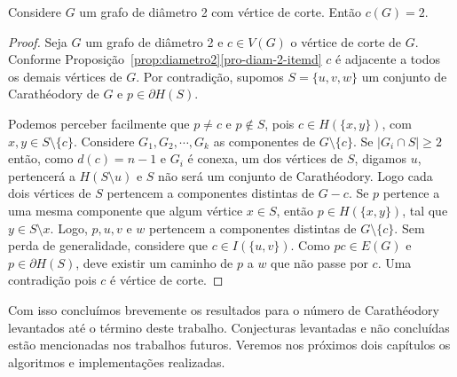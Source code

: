 \begin{proposition} 
Considere $G$ um grafo de diâmetro 2 com vértice de corte. Então $c(G) = 2$.
\label{prop:carat}
\end{proposition}
\begin{proof} 
   Seja $G$ um grafo de diâmetro 2 e $c \in V(G)$ o vértice de corte de $G$. Conforme Proposição~\ref{prop:diametro2}\ref{pro-diam-2-itemd} $c$ é adjacente a todos os demais vértices de $G$. Por contradição, supomos $S=\{u,v,w\}$ um conjunto de Carathéodory de $G$ e $p \in \partial H(S)$.
   
   Podemos perceber facilmente que $p \ne c$ e $p \not\in S$, pois $c \in H(\{x,y\})$, com $x,y \in S\setminus \{c\}$. Considere $G_1, G_2, \cdots, G_k$ as componentes de $G \setminus \{c\}$. Se $|G_i \cap S| \geq 2$ então, como $d(c)=n-1$ e $G_i$ é conexa, um dos vértices de $S$, digamos $u$, pertencerá a $H(S\setminus u)$ e $S$ não será um conjunto de Carathéodory. Logo cada dois vértices de $S$ pertencem a componentes distintas de $G-c$. Se $p$ pertence a uma mesma componente que algum vértice $x \in S$, então $p \in H(\{x,y\})$, tal que $y \in S \setminus x$. Logo, $p, u, v$ e $w$ pertencem a componentes distintas de $G \setminus \{c\}$.
   Sem perda de generalidade, considere que $c \in I(\{u,v\})$. Como $pc \in E(G)$ e $p \in \partial H(S)$, deve existir um caminho de $p$ a $w$ que não passe por $c$. Uma contradição pois $c$ é vértice de corte.
   
\end{proof}

Com isso concluímos brevemente os resultados para o número de Carathéodory levantados até o término deste trabalho. Conjecturas levantadas e não concluídas estão mencionadas nos trabalhos futuros. Veremos nos próximos dois capítulos os algoritmos e implementações realizadas. 

